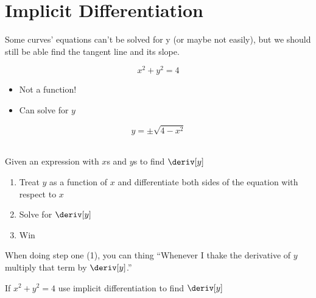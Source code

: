 
\section{Implicit Differentiation}
Some curves' equations can't be solved for y (or maybe not easily), but we should still be able find the tangent line and its slope.
\begin{example}
    \begin{equation*}
        x^2 + y^2 = 4
    \end{equation*}
    \begin{itemize}
        \item Not a function!
        \item Can solve for $y$
    \end{itemize}
    \begin{equation*}
        y = \pm \sqrt{4 - x^2}
    \end{equation*}
    \\
    Given an expression with $x$s and $y$s to find $\deriv[y]$
    \begin{enumerate}
        \item Treat $y$ as a function of $x$ and differentiate both sides of the equation with respect to $x$
        \item Solve for $\deriv[y]$
        \item Win
    \end{enumerate}
    \begin{note}
        When doing step one (1), you can thing ``Whenever I thake the derivative of $y$ multiply that term by $\deriv[y]$.''
    \end{note}
    \begin{example}
        If $x^2 + y^2 = 4$ use implicit differentiation to find $\deriv[y]$
        
    \end{example}
\end{example}
